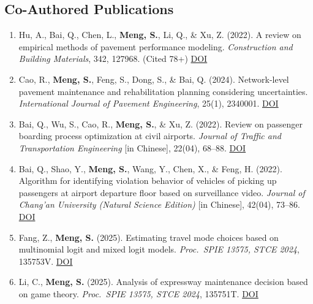 \documentclass[11pt,a4paper]{article}
\begin{document}
\subsection*{Co-Authored Publications}
\begin{enumerate}[leftmargin=1.2em]
    \item Hu, A., Bai, Q., Chen, L., \textbf{Meng, S.}, Li, Q., \& Xu, Z. (2022). A review on empirical methods of pavement performance modeling. \textit{Construction and Building Materials}, 342, 127968. (Cited 78+) \href{https://doi.org/10.1016/j.conbuildmat.2022.127968}{DOI}
    \item Cao, R., \textbf{Meng, S.}, Feng, S., Dong, S., \& Bai, Q. (2024). Network-level pavement maintenance and rehabilitation planning considering uncertainties. \textit{International Journal of Pavement Engineering}, 25(1), 2340001. \href{https://doi.org/10.1080/10298436.2024.2340001}{DOI}
    \item Bai, Q., Wu, S., Cao, R., \textbf{Meng, S.}, \& Xu, Z. (2022). Review on passenger boarding process optimization at civil airports. \textit{Journal of Traffic and Transportation Engineering} [in Chinese], 22(04), 68--88. \href{https://doi.org/10.19818/j.cnki.1671-1637.2022.04.005}{DOI}
    \item Bai, Q., Shao, Y., \textbf{Meng, S.}, Wang, Y., Chen, X., \& Feng, H. (2022). Algorithm for identifying violation behavior of vehicles of picking up passengers at airport departure floor based on surveillance video. \textit{Journal of Chang'an University (Natural Science Edition)} [in Chinese], 42(04), 73--86. \href{https://doi.org/10.1117/12.3060925}{DOI}
    \item Fang, Z., \textbf{Meng, S.} (2025). Estimating travel mode choices based on multinomial logit and mixed logit models. \textit{Proc.\ SPIE 13575, STCE 2024}, 135753V. \href{https://doi.org/10.19721/j.cnki.1671-8879.2022.04.008}{DOI}
    \item Li, C., \textbf{Meng, S.} (2025). Analysis of expressway maintenance decision based on game theory. \textit{Proc.\ SPIE 13575, STCE 2024}, 135751T. \href{https://doi.org/10.1117/12.3061486}{DOI}
\end{enumerate}

\end{document}

